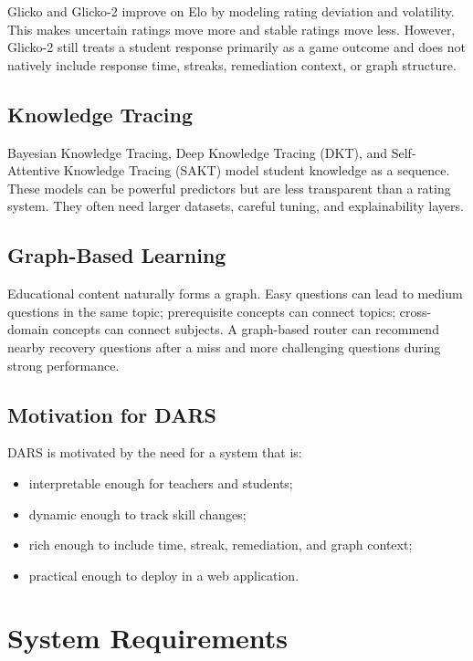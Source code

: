\documentclass[12pt,a4paper]{report}
\begin{document}
Glicko and Glicko-2 improve on Elo by modeling rating deviation and volatility. This makes uncertain ratings move more and stable ratings move less. However, Glicko-2 still treats a student response primarily as a game outcome and does not natively include response time, streaks, remediation context, or graph structure.

\section{Knowledge Tracing}
Bayesian Knowledge Tracing, Deep Knowledge Tracing (DKT), and Self-Attentive Knowledge Tracing (SAKT) model student knowledge as a sequence. These models can be powerful predictors but are less transparent than a rating system. They often need larger datasets, careful tuning, and explainability layers.

\section{Graph-Based Learning}
Educational content naturally forms a graph. Easy questions can lead to medium questions in the same topic; prerequisite concepts can connect topics; cross-domain concepts can connect subjects. A graph-based router can recommend nearby recovery questions after a miss and more challenging questions during strong performance.

\section{Motivation for DARS}
DARS is motivated by the need for a system that is:

\begin{itemize}[leftmargin=*]
  \item interpretable enough for teachers and students;
  \item dynamic enough to track skill changes;
  \item rich enough to include time, streak, remediation, and graph context;
  \item practical enough to deploy in a web application.
\end{itemize}

\chapter{System Requirements}
\end{document}

